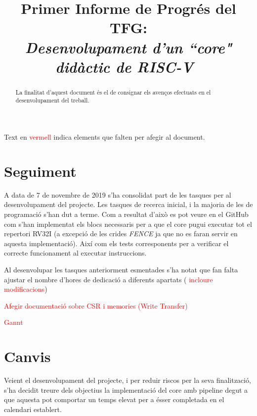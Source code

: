 \documentclass[conference,onecolumn, catalan]{IEEEtran}
\title{Primer Informe de Progrés del TFG: \\ \vspace{0.2cm} {\huge \textit{ Desenvolupament d'un ``core" didàctic de RISC-V\ }} }
\author{
\IEEEauthorblockN{Pau Casacuberta Orta}
\IEEEauthorblockA{
\textit{Autonomous University of Barcelona}\\
Cerdanyola del Vallès, Barcelona 08193\\
pau.casacubertao@e-campus.uab.cat\\}}
\newcommand\todo[1]{\textcolor{red}{#1}}
\begin{document}
\maketitle

\begin{versionhistory}
\end{versionhistory}

Text en \todo{vermell} indica elements que falten per afegir al document.

\begin{abstract}
La finalitat d'aquest document és el de consignar els avenços efectuats en el desenvolupament del treball.
\end{abstract}

\section{Seguiment}

A data de 7 de novembre de 2019 s'ha consolidat part de les tasques per al desenvolupament del projecte. 
Les tasques de recerca inicial, i la majoria de les de programació s'han dut a terme. Com a resultat d'això es pot veure en el GitHub\cite{casacuberta_orta_4a1c0/rv32i-verilog_2019} com s'han implementat els blocs necessaris per a que el core pugui executar tot el repertori RV32I (a excepció de les crides \textit{FENCE} ja que no es faran servir en aquesta implementació). 
Així com els tests corresponents per a verificar el correcte funcionament al executar instruccions.

Al desenvolupar les tasques anteriorment esmentades s'ha notat que fan falta ajustar el nombre d'hores de dedicació a diferents apartats (\todo{ incloure modificacions})

\todo{Afegir documentació sobre CSR i memories (Write Transfer)}

\todo{Gannt}

\section{Canvis}

Veient el desenvolupament del projecte, i per reduir riscos per la seva finalització, s'ha decidit treure dels objectius la implementació del core amb pipeline degut a que aquesta pot comportar un temps elevat per a ésser completada en el calendari establert.
\end{document}
